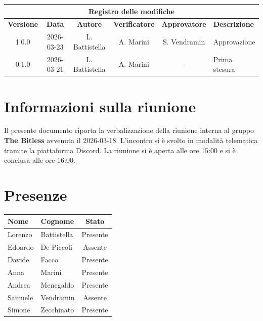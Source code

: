\documentclass[a4paper, 10pt, colorlinks=true, linkcolor=black, urlcolor=blue, citecolor=blue, hidelinks]{article}
\begin{document}
\newcommand{\tipoverbale}{Interno}
\newcommand{\dataverbale}{2026-03-18}
\newcommand{\dataversione}{2026-03-23}
\newcommand{\versione}{1.0.0}
\newcommand{\stato}{Approvato}
\newcommand{\destinatari}{The Bitless, prof. Tullio Vardanega, prof. Riccardo Cardin}

\begin{titlepage}

\end{titlepage}

\newpage
{}

\begin{center}
    \begin{tabular}{|c|c|c|c|c|p{3.5cm}|}
        \hline
        \multicolumn{6}{|c|}{\textbf{Registro delle modifiche}} \\
        \hline
        \textbf{Versione} & \textbf{Data} & \textbf{Autore} & \textbf{Verificatore} & \textbf{Approvatore} & \textbf{Descrizione} \\
        \hline 
        1.0.0 & 2026-03-23 & L. Battistella & A. Marini & S. Vendramin & Approvazione  \\
        \hline
        0.1.0 & 2026-03-21 & L. Battistella & A. Marini & - & Prima stesura \\
        \hline
    \end{tabular}
\end{center}

\newpage
\tableofcontents 

\newpage
\section{Informazioni sulla riunione}
Il presente documento riporta la verbalizzazione della riunione interna al gruppo \textbf{The Bitless} avvenuta il \dataverbale{}. L'incontro si è svolto in modalità telematica tramite la piattaforma Discord. La riunione si è aperta alle ore 15:00 e si è conclusa alle ore 16:00.

\section{Presenze}
\begin{center}
\begin{tabular}{|l|l|c|}
\hline
\textbf{Nome} & \textbf{Cognome} & \textbf{Stato} \\
\hline
Lorenzo & Battistella & Presente \\
Edoardo & De Piccoli & Assente \\
Davide & Facco & Presente \\
Anna & Marini & Presente \\
Andrea & Menegaldo & Presente \\
Samuele & Vendramin & Assente \\
Simone & Zecchinato & Presente \\
\hline
\end{tabular}
\end{center}
\end{document}
